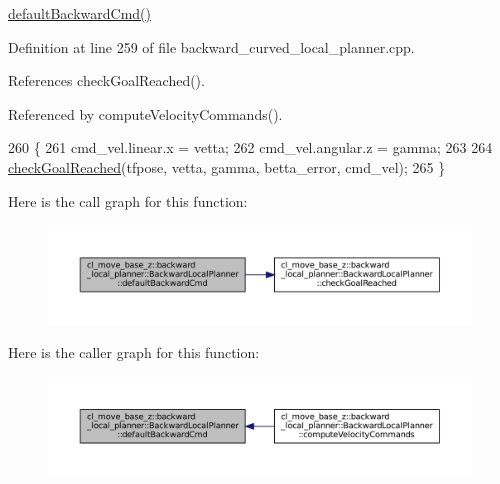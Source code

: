 \hyperlink{classcl__move__base__z_1_1backward__local__planner_1_1BackwardLocalPlanner_a1ebd69a028a22e3573e98f89d593f97d}{default\+Backward\+Cmd()} 

Definition at line 259 of file backward\+\_\+curved\+\_\+local\+\_\+planner.\+cpp.



References check\+Goal\+Reached().



Referenced by compute\+Velocity\+Commands().


\begin{DoxyCode}
260         \{
261             cmd\_vel.linear.x = vetta;
262             cmd\_vel.angular.z = gamma;
263 
264             \hyperlink{classcl__move__base__z_1_1backward__local__planner_1_1BackwardLocalPlanner_a6c4363e82119a6a8a5a3bfe309280898}{checkGoalReached}(tfpose, vetta, gamma, betta\_error, cmd\_vel);
265         \}
\end{DoxyCode}
Here is the call graph for this function\+:
\nopagebreak
\begin{figure}[H]
\begin{center}
\leavevmode
\includegraphics[width=350pt]{classcl__move__base__z_1_1backward__local__planner_1_1BackwardLocalPlanner_a1ebd69a028a22e3573e98f89d593f97d_cgraph}
\end{center}
\end{figure}
Here is the caller graph for this function\+:
\nopagebreak
\begin{figure}[H]
\begin{center}
\leavevmode
\includegraphics[width=350pt]{classcl__move__base__z_1_1backward__local__planner_1_1BackwardLocalPlanner_a1ebd69a028a22e3573e98f89d593f97d_icgraph}
\end{center}
\end{figure}
\mbox{\label{classcl__move__base__z_1_1backward__local__planner_1_1BackwardLocalPlanner_ab1b01ecdb27641dde60661362d75465b}} 
